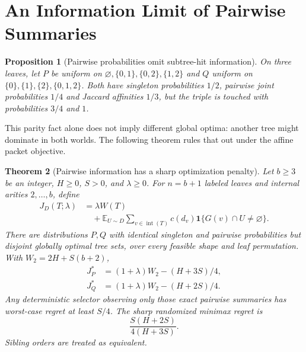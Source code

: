 \documentclass[10pt,journal,compsoc]{IEEEtran}
\newtheorem{theorem}{Theorem}
\newtheorem{proposition}[theorem]{Proposition}
\theoremstyle{definition}\newtheorem{definition}[theorem]{Definition}
\newcommand{\E}{\mathbb E}\newcommand{\ind}{\mathbf 1}
\begin{document}
\section{An Information Limit of Pairwise Summaries}
\begin{proposition}[Pairwise probabilities omit subtree-hit information]\label{prop:pairwise}
On three leaves, let $P$ be uniform on
$\varnothing,\{0,1\},\{0,2\},\{1,2\}$ and $Q$ uniform on
$\{0\},\{1\},\{2\},\{0,1,2\}$. Both have singleton probabilities $1/2$,
pairwise joint probabilities $1/4$ and Jaccard affinities $1/3$, but the
triple is touched with probabilities $3/4$ and $1$.
\end{proposition}
This parity fact alone does not imply different global optima: another tree
might dominate in both worlds. The following theorem rules that out under
the affine packet objective.
\begin{theorem}[Pairwise information has a sharp optimization penalty]\label{thm:pairwise-optimum}
Let $b\ge3$ be an integer, $H\ge0$, $S>0$, and $\lambda\ge0$.
For $n=b+1$ labeled leaves and internal arities $2,\ldots,b$, define
\begin{align*}
 J_D(T;\lambda)&=\lambda W(T)\\
 &\quad+\E_{U\sim D}\sum_{v\in\operatorname{int}(T)}c(d_v)
       \ind\{G(v)\cap U\ne\varnothing\}.
\end{align*}
There are distributions $P,Q$ with identical singleton and pairwise
probabilities but disjoint globally optimal tree sets, over every feasible
shape and leaf permutation. With $W_2=2H+S(b+2)$,
\begin{align}
 J_P^*&=(1+\lambda)W_2-(H+3S)/4,\label{eq:general-p}\\
 J_Q^*&=(1+\lambda)W_2-(H+2S)/4.\label{eq:general-q}
\end{align}
Any deterministic selector observing only those exact pairwise summaries has
worst-case regret at least $S/4$. The sharp randomized minimax regret is
\begin{equation}\label{eq:minimax-pairwise}
 \frac{S(H+2S)}{4(H+3S)}.
\end{equation}
Sibling orders are treated as equivalent.
\end{theorem}
\end{document}

